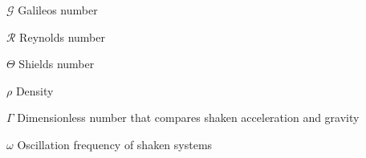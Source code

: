 
\begin{simbolos}
    \item[$\mathcal{G}$] Galileos number
    \item[$\mathcal{R}$] Reynolds number
    \item[$\Theta$] Shields number
    \item[$\rho$] Density
    \item[$\Gamma$] Dimensionless number that compares shaken acceleration and gravity
    \item[$\omega$] Oscillation frequency of shaken systems
\end{simbolos}

